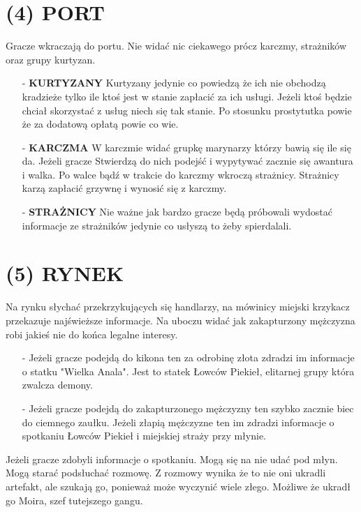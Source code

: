 \documentclass[14pt]{article}
\begin{document}
\section*{(4) PORT}
\RaggedRight
Gracze wkraczają do portu. Nie widać nic ciekawego prócz karczmy, strażników oraz grupy kurtyzan.
\begin{itemize}
    \item[-] \textbf{KURTYZANY}
    Kurtyzany jedynie co powiedzą że ich nie obchodzą kradzieże tylko ile ktoś jest w stanie zapłacić za ich usługi. Jeżeli ktoś będzie chciał skorzystać z usług niech się tak stanie. Po stosunku prostytutka powie że za dodatową opłatą powie co wie.
    \item[-] \textbf{KARCZMA}
    W karczmie widać grupkę marynarzy którzy bawią się ile się da. Jeżeli gracze Stwierdzą do nich podejść i wypytywać zacznie się awantura i walka. Po walce bądź w trakcie do karczmy wkroczą strażnicy. Strażnicy karzą zapłacić grzywnę i wynosić się z karczmy.
    \item[-] \textbf{STRAŻNICY}
    Nie ważne jak bardzo gracze będą próbowali wydostać informacje ze strażników jedynie co usłyszą to żeby spierdalali.
\end{itemize}

\Centering
\section*{(5) RYNEK}
\RaggedRight
Na rynku słychać przekrzykujących się handlarzy, na mówinicy miejski krzykacz przekazuje najświeższe informacje. Na uboczu widać jak zakapturzony mężczyzna robi jakieś nie do końca legalne interesy.
\begin{itemize}
    \item[-] Jeżeli gracze podejdą do kikona ten za odrobinę złota zdradzi im informacje o statku "Wielka Anala". Jest to statek Łowców Piekieł, elitarnej grupy która zwalcza demony.
    \item[-] Jeżeli gracze podejdą do zakapturzonego mężczyzny ten szybko zacznie biec do ciemnego zaułku. Jeżeli złapią mężczyzne ten im zdradzi informacje o spotkaniu Łowców Piekieł i miejskiej straży przy młynie.
\end{itemize}
Jeżeli gracze zdobyli informacje o spotkaniu. Mogą się na nie udać pod młyn. Mogą starać podsłuchać rozmowę. Z rozmowy wynika że to nie oni ukradli artefakt, ale szukają go, ponieważ może wyczynić wiele złego. Możliwe że ukradł go Moira, szef tutejszego gangu.
\newpage

\Centering
\end{document}
